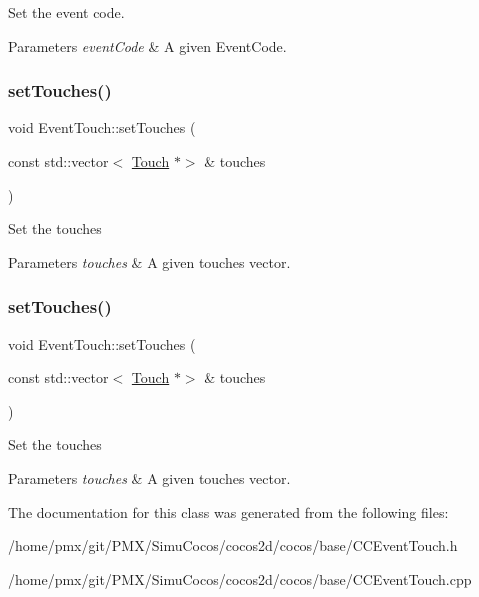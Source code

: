 Set the event code.


\begin{DoxyParams}{Parameters}
{\em event\+Code} & A given Event\+Code. \\
\hline
\end{DoxyParams}
\mbox{\label{classEventTouch_a19bd66fc0c1460d4064c8551afcc8bb0}} 
\subsubsection{\texorpdfstring{set\+Touches()}{setTouches()}\hspace{0.1cm}{\footnotesize\ttfamily [1/2]}}
{\footnotesize\ttfamily void Event\+Touch\+::set\+Touches (\begin{DoxyParamCaption}\item[{const std\+::vector$<$ \hyperlink{classTouch}{Touch} $\ast$$>$ \&}]{touches }\end{DoxyParamCaption})\hspace{0.3cm}{\ttfamily [inline]}}

Set the touches


\begin{DoxyParams}{Parameters}
{\em touches} & A given touches vector. \\
\hline
\end{DoxyParams}
\mbox{\label{classEventTouch_a19bd66fc0c1460d4064c8551afcc8bb0}} 
\subsubsection{\texorpdfstring{set\+Touches()}{setTouches()}\hspace{0.1cm}{\footnotesize\ttfamily [2/2]}}
{\footnotesize\ttfamily void Event\+Touch\+::set\+Touches (\begin{DoxyParamCaption}\item[{const std\+::vector$<$ \hyperlink{classTouch}{Touch} $\ast$$>$ \&}]{touches }\end{DoxyParamCaption})\hspace{0.3cm}{\ttfamily [inline]}}

Set the touches


\begin{DoxyParams}{Parameters}
{\em touches} & A given touches vector. \\
\hline
\end{DoxyParams}


The documentation for this class was generated from the following files\+:\begin{DoxyCompactItemize}
\item 
/home/pmx/git/\+P\+M\+X/\+Simu\+Cocos/cocos2d/cocos/base/C\+C\+Event\+Touch.\+h\item 
/home/pmx/git/\+P\+M\+X/\+Simu\+Cocos/cocos2d/cocos/base/C\+C\+Event\+Touch.\+cpp\end{DoxyCompactItemize}
